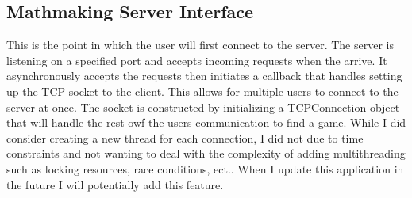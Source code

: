 \documentclass[conference]{IEEEtran}
\begin{document}
\subsection{Mathmaking Server Interface}
This is the point in which the user will first connect to the server.
The server is listening on a specified port and accepts incoming requests when the arrive. 
It asynchronously accepts the requests then initiates a callback that handles setting up the TCP socket to the client.
This allows for multiple users to connect to the server at once. 
	The socket is constructed by initializing a TCPConnection object that will handle the rest owf the users communication to find a game.
While I did consider creating a new thread for each connection, I did not due to time constraints and not wanting to deal with the complexity of adding multithreading such as locking resources, race conditions, ect..
When I update this application in the future I will potentially add this feature.
\end{document}
